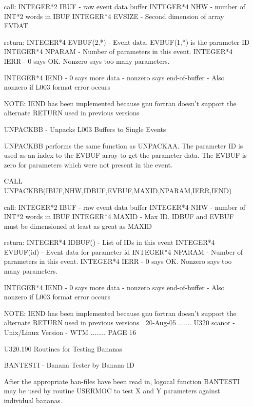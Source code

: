    call:   INTEGER*2  IBUF       - raw event data buffer
           INTEGER*4  NHW        - number of INT*2 words in IBUF
           INTEGER*4  EVSIZE     - Second dimension of array EVDAT
 
   return: INTEGER*4  EVBUF(2,*) - Event data. EVBUF(1,*) is the parameter ID
           INTEGER*4  NPARAM     - Number of parameters in this event.
           INTEGER*4  IERR       - 0 says OK.  Nonzero says too many parameters.
 
           INTEGER*4  IEND       - 0 says more data - nonzero says end-of-buffer
                                 - Also nonzero if L003 format error occurs
 
   NOTE: IEND has been implemented because gnu fortran doesn't support the
   alternate RETURN used in previous versions
 
 
   UNPACKBB - Unpacks L003 Buffers to Single Events
 
   UNPACKBB performs the same function as UNPACKAA.  The parameter ID  is used
   as  an  index  to  the EVBUF array to get the parameter data.  The EVBUF is
   zero for parameters which were not present in the event.
 
        CALL UNPACKBB(IBUF,NHW,IDBUF,EVBUF,MAXID,NPARAM,IERR,IEND)
 
   call:   INTEGER*2  IBUF      - raw event data buffer
           INTEGER*4  NHW       - number of INT*2 words in IBUF
           INTEGER*4  MAXID     - Max ID. IDBUF and EVBUF must be dimensioned
                                  at least as great as MAXID
 
   return: INTEGER*4  IDBUF()   - List of IDs in this event
           INTEGER*4  EVBUF(id) - Event data for parameter id
           INTEGER*4  NPARAM    - Number of parameters in this event.
           INTEGER*4  IERR      - 0 says OK. Nonzero says too many parameters.
 
           INTEGER*4  IEND       - 0 says more data - nonzero says end-of-buffer
                                 - Also nonzero if L003 format error occurs
 
   NOTE: IEND has been implemented because gnu fortran doesn't support the
   alternate RETURN used in previous versions
    
   20-Aug-05 ....... U320  scanor - Unix/Linux Version - WTM ........ PAGE  16
 
 
   U320.190  Routines for Testing Bananas
 
   BANTESTI - Banana Tester by Banana ID
 
   After the  appropriate  ban-files  have  been  read  in,  logocal  function
   BANTESTI  may be used by routine USERMOC to test X and Y parameters against
   individual bananas.
 
